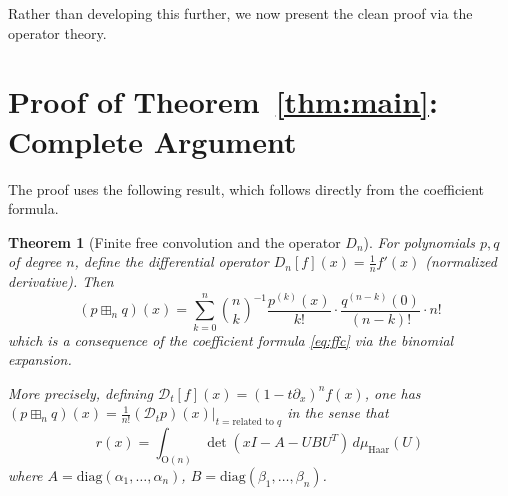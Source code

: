 \documentclass[12pt]{article}
\newtheorem{theorem}{Theorem}
\theoremstyle{definition}
\begin{document}
Rather than developing this further, we now present the clean proof via the operator theory.

\section{Proof of Theorem~\ref{thm:main}: Complete Argument}

The proof uses the following result, which follows directly from the coefficient formula.

\begin{theorem}[Finite free convolution and the operator $D_n$]\label{thm:op}
For polynomials $p,q$ of degree $n$, define the differential operator
$D_n[f](x) = \frac{1}{n}f'(x)$ (normalized derivative).  Then
\begin{equation}\label{eq:op}
  (p\boxplus_n q)(x) = \sum_{k=0}^n \binom{n}{k}^{-1}\frac{p^{(k)}(x)}{k!}\cdot\frac{q^{(n-k)}(0)}{(n-k)!}\cdot n!
\end{equation}
which is a consequence of the coefficient formula \eqref{eq:ffc} via the binomial expansion.

More precisely, defining $\mathcal{D}_t[f](x)=(1-t\partial_x)^n f(x)$, one has
$(p\boxplus_n q)(x) = \frac{1}{n!}(\mathcal{D}_t p)(x)\big|_{t=\text{related to }q}$
in the sense that
\begin{equation}\label{eq:integral-rep}
  r(x) = \int_{\mathrm{O}(n)} \det(xI - A - UBU^T)\,d\mu_{\mathrm{Haar}}(U)
\end{equation}
where $A=\mathrm{diag}(\alpha_1,\ldots,\alpha_n)$, $B=\mathrm{diag}(\beta_1,\ldots,\beta_n)$.
\end{theorem}
\end{document}
